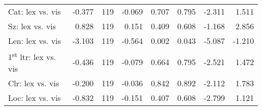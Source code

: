 \begin{tabular}{lrrrrrrr}
Cat: lex vs. vis                       &    -0.377 & 119 &      -0.069 &           0.707 &                 0.795 &                -2.311 &                 1.511 \\
Sz: lex vs. vis                        &     0.828 & 119 &       0.151 &           0.409 &                 0.608 &                -1.168 &                 2.856 \\
Len: lex vs. vis                       &    -3.103 & 119 &      -0.564 &           0.002 &                 0.043 &                -5.087 &                -1.210 \\
1\textsuperscript{st} ltr: lex vs. vis &    -0.436 & 119 &      -0.079 &           0.664 &                 0.795 &                -2.521 &                 1.472 \\
Clr: lex vs. vis                       &    -0.200 & 119 &      -0.036 &           0.842 &                 0.892 &                -2.112 &                 1.783 \\
Loc: lex vs. vis                       &    -0.832 & 119 &      -0.151 &           0.407 &                 0.608 &                -2.799 &                 1.121 \\
\bottomrule
\end{tabular}

